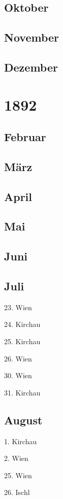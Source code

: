 \documentclass[twoside=false,titlepage=false,open=any, parskip=never, fontsize=10pt, headings=small, chapterprefix=false, appendixprefix=false, DIV=15]{scrbook}
\begin{document}
\begin{multicols}{3}
            \section*{Oktober}
            \section*{November}
            \section*{Dezember}
            \chapter*{1892}
            \section*{Februar}
            \section*{März}
            \section*{April}
            \section*{Mai}
            \section*{Juni}
            \section*{Juli}
            23. Wien\par
            24. Kirchau\par
            25. Kirchau\par
            26. Wien\par
            30. Wien\par
            31. Kirchau\par
            \section*{August}
            1. Kirchau\par
            2. Wien\par
            25. Wien\par
            26. Ischl\par

\end{multicols}
\end{document}
